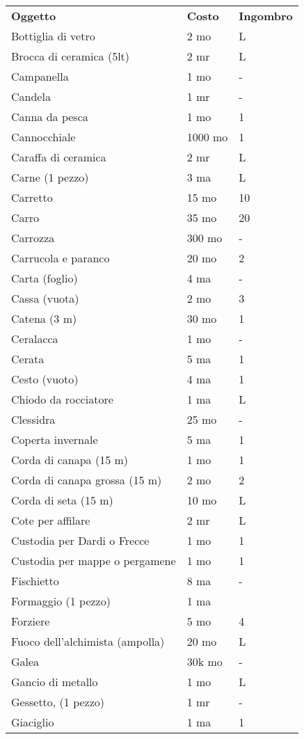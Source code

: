 \documentclass[12pt,a4paper,twoside,openany]{book}
\begin{document}
\begin{multicols}{2}
{\begin{tabularx}{0.42\textwidth}{lll}
\textbf{Oggetto}    & \textbf{Costo} & \textbf{Ingombro}\\
Bottiglia di vetro  & 2 mo& L \\
Brocca di ceramica  (5lt) & 2 mr& L\\
Campanella  & 1 mo& - \\
Candela & 1 mr& -\\
Canna da pesca & 1 mo&1\\
Cannocchiale  & 1000 mo  & 1 \\
Caraffa di ceramica & 2 mr& L\\
Carne (1 pezzo) & 3 ma& L\\
Carretto  & 15 mo  & 10\\
Carro & 35 mo& 20\\
Carrozza  & 300 mo & -\\
Carrucola e paranco & 20 mo& 2 \\
Carta (foglio)& 4 ma& -\\
Cassa (vuota) & 2 mo& 3 \\
Catena (3 m)  & 30 mo & 1\\
Ceralacca& 1 mo& -\\
Cerata&5 ma&1\\
Cesto (vuoto) & 4 ma& 1 \\
Chiodo da rocciatore& 1 ma&L\\
Clessidra& 25 mo  & -\\
Coperta invernale & 5 ma& 1 \\
Corda di canapa (15 m)& 1 mo& 1\\
Corda di canapa grossa (15 m)& 2 mo& 2 \\
Corda di seta (15 m)& 10 mo  & L\\
Cote per affilare & 2 mr& L \\
Custodia per Dardi o Frecce  & 1 mo& 1 \\
Custodia per mappe o pergamene  & 1 mo& 1 \\
Fischietto  & 8 ma& - \\
Formaggio (1 pezzo)& 1 ma& \\
Forziere & 5 mo&4\\
Fuoco dell'alchimista (ampolla)& 20 mo& L\\
Galea & 30k mo  & -\\
Gancio di metallo & 1 mo& L\\
Gessetto, (1 pezzo) & 1 mr& -  \\
Giaciglio& 1 ma& 1 \\

\end{tabularx}}
\end{multicols}
\end{document}
